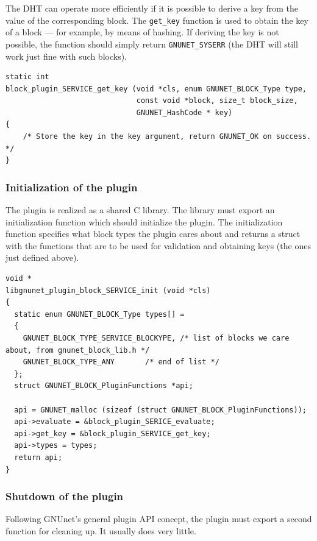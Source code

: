 \documentclass[10pt]{article}
\begin{document}
The DHT can operate more efficiently if it is possible to derive a key
from the value of the corresponding block.  The {\tt get\_key}
function is used to obtain the key of a block --- for example, by
means of hashing.  If deriving the key is not possible, the function
should simply return {\tt GNUNET\_SYSERR} (the DHT will still work
just fine with such blocks).

\lstset{language=C}
\begin{lstlisting}
static int
block_plugin_SERVICE_get_key (void *cls, enum GNUNET_BLOCK_Type type,
                              const void *block, size_t block_size,
                              GNUNET_HashCode * key)
{
    /* Store the key in the key argument, return GNUNET_OK on success. */
}
\end{lstlisting}

\subsubsection{Initialization of the plugin}

The plugin is realized as a shared C library.  The library must export
an initialization function which should initialize the plugin.  The
initialization function specifies what block types the plugin cares
about and returns a struct with the functions that are to be used for
validation and obtaining keys (the ones just defined above).

\lstset{language=C}
\begin{lstlisting}
void *
libgnunet_plugin_block_SERVICE_init (void *cls)
{
  static enum GNUNET_BLOCK_Type types[] =
  {
    GNUNET_BLOCK_TYPE_SERVICE_BLOCKYPE, /* list of blocks we care about, from gnunet_block_lib.h */
    GNUNET_BLOCK_TYPE_ANY       /* end of list */
  };
  struct GNUNET_BLOCK_PluginFunctions *api;

  api = GNUNET_malloc (sizeof (struct GNUNET_BLOCK_PluginFunctions));
  api->evaluate = &block_plugin_SERICE_evaluate;
  api->get_key = &block_plugin_SERVICE_get_key;
  api->types = types;
  return api;
}
\end{lstlisting}

\subsubsection{Shutdown of the plugin}

Following GNUnet's general plugin API concept, the plugin must
export a second function for cleaning up.  It usually does very
little.
\end{document}
